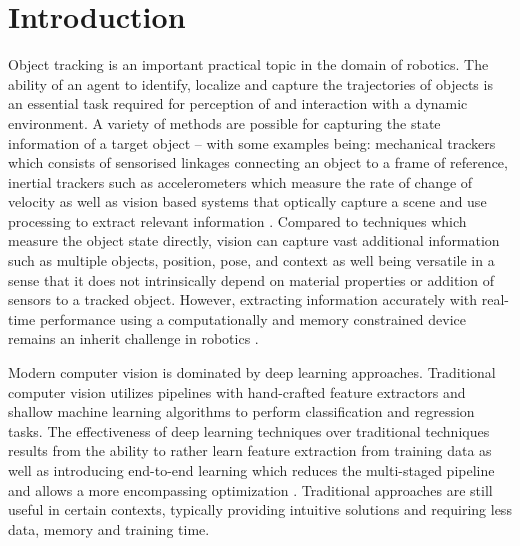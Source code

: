 \documentclass[a4paper,twoside,12pt]{report}
\begin{document}
\listoffigures
\newpage
{}
{}

\listoftables
\newpage
{}

\chapter{Introduction}

Object tracking is an important practical topic in the domain of robotics. The ability of an agent to identify, localize and capture the trajectories of objects is an essential task required for perception of and interaction with a dynamic environment. A variety of methods are possible for capturing the state information of a target object -- with some examples being: mechanical trackers which consists of sensorised linkages connecting an object to a frame of reference, inertial trackers such as accelerometers which measure the rate of change of velocity as well as vision based systems that optically capture a scene and use processing to extract relevant information \citep{track2}. Compared to techniques which measure the object state directly, vision can capture vast additional information such as multiple objects, position, pose,  and context as well being versatile in a sense that it does not intrinsically depend on material properties or addition of sensors to a tracked object. However, extracting information accurately with real-time performance using a computationally and memory constrained device remains an inherit challenge in robotics \citep{quantization, kalmannet}. 

Modern computer vision is dominated by deep learning approaches. Traditional computer vision utilizes pipelines with hand-crafted feature extractors and shallow machine learning algorithms to perform classification and regression tasks. The effectiveness of deep learning techniques over traditional techniques results from the ability to rather learn feature extraction from training data as well as introducing end-to-end learning which reduces the multi-staged pipeline and allows a more encompassing optimization \citep{tradvmod}. Traditional approaches are still useful in certain contexts, typically providing intuitive solutions and requiring less data, memory and training time.
\end{document}
